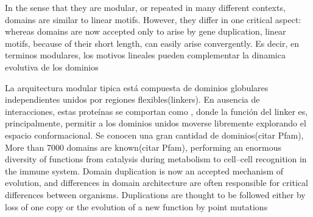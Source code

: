 



In the sense that they are modular, or repeated in many different contexts, domains are similar to linear motifs. 
However, they differ in one critical aspect: whereas domains are now accepted only to arise by gene duplication, linear motifs, because of their short length, can easily arise convergently.
Es decir, en terminos modulares, los motivos lineales pueden complementar la dinamica evolutiva de los dominios



La arquitectura modular tipica está compuesta de dominios globulares independientes unidos por regiones flexibles(linkers).
En ausencia de interacciones, estas proteínas se comportan como  , donde la función del linker es, principalmente, permitir a los dominios unidos moverse libremente explorando el espacio conformacional.
Se conocen una gran cantidad de dominios(citar Pfam), 
More than 7000 domains are known(citar Pfam), performing an enormous diversity of functions from catalysis during metabolism to cell–cell recognition in the immune system. 
Domain duplication is now an accepted mechanism of evolution, and differences in domain architecture are often responsible for critical differences between organisms.
Duplications are thought to be followed either by loss of one copy or the evolution of a new function by point mutations


